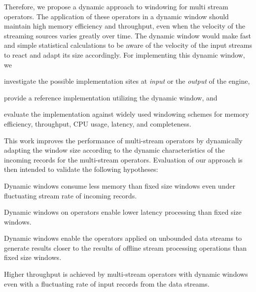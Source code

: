 Therefore, we propose a dynamic approach to windowing for multi stream operators.
The application of these operators in a dynamic window should maintain high memory efficiency and throughput,
even when the velocity of the streaming sources varies greatly over time. 
The dynamic window would make fast and simple statistical calculations to be 
aware of the velocity of the input streams to react and adapt its size accordingly. 
For implementing this dynamic window, we 
\renewcommand{\labelenumi}{(\roman{enumi})}
\begin{enumerate*}
    \item investigate the possible implementation sites at \emph{input}
    or the \emph{output} of the engine, 
    \item provide a reference implementation utilizing the dynamic window, and 
    \item evaluate the implementation against widely used windowing schemes for 
    memory efficiency, throughput, CPU usage, latency, and completeness. 
\end{enumerate*}


This work improves the performance of multi-stream operators 
by dynamically adapting the window size according to the dynamic characteristics
of the incoming records for the multi-stream operators. Evaluation of 
our approach is then intended to validate the following hypotheses: 

\begin{hyp}
    Dynamic windows consume less memory than 
    fixed size windows even under fluctuating 
    stream rate of incoming records. 
\end{hyp}

\begin{hyp}
    Dynamic windows on operators enable lower latency 
    processing than fixed size windows. 
\end{hyp}

\begin{hyp}
    Dynamic windows enable the operators applied on
    unbounded data streams to generate 
    results closer to the results of offline stream processing operations
    than fixed size windows. 
\end{hyp}
\begin{hyp}
    Higher throughput is achieved by multi-stream operators 
    with dynamic windows even with a fluctuating
    rate of input records from the data streams.
\end{hyp}


